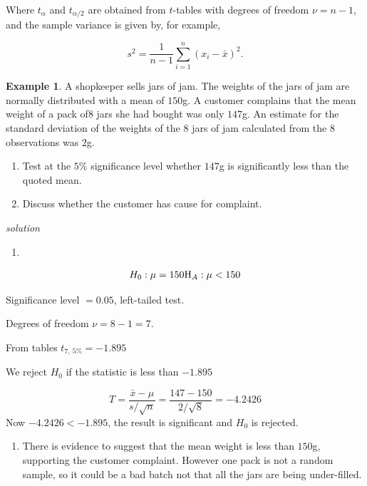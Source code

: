 \documentclass[
]{book}
\providecommand{\tightlist}{%
  \setlength{\itemsep}{0pt}\setlength{\parskip}{0pt}}
\theoremstyle{definition}
\theoremstyle{definition}
\newtheorem{example}{Example}[chapter]
\theoremstyle{definition}
\theoremstyle{definition}
\theoremstyle{remark}
\begin{document}
Where \(t_{\alpha}\) and \(t_{\alpha/2}\) are obtained from \(t\)-tables with degrees of freedom \(\nu = n-1\), and the sample variance is given by, for example,

\[s^2 =\frac{1}{n-1}\sum_{i=1}^{n}(x_i-\bar{x})^2.\]

\begin{example}

A shopkeeper sells jars of jam. The weights of the jars of jam are normally distributed with a mean of \(150\)g. A customer complains that the mean weight of a pack of\(8\) jars she had bought was only \(147\)g. An estimate for the standard deviation of the weights of the \(8\) jars of jam calculated from the \(8\) observations was \(2\)g.

\begin{enumerate}
\def\labelenumi{\alph{enumi})}
\item
  Test at the \(5\%\) significance level whether \(147\)g is significantly less than the quoted mean.
\item
  Discuss whether the customer has cause for complaint.
\end{enumerate}

\emph{solution}

\begin{enumerate}
\def\labelenumi{\alph{enumi})}
\item
\end{enumerate}

\[H_{0}: \mu = 150 \\ \text{H}_A: \mu<150\]

Significance level \(=0.05\), left-tailed test.

Degrees of freedom \(\nu = 8-1 = 7\).

From tables \(t_{7, \ 5\%} = -1.895\)

We reject \(H_0\) if the statistic is less than \(-1.895\)

\[T =\frac{\bar{x}-\mu}{s/\sqrt{n}}=\frac{147-150}{2/\sqrt{8}}=-4.2426 \]
Now \(-4.2426 < -1.895\), the result is significant and \(H_0\) is rejected.

\begin{enumerate}
\def\labelenumi{\alph{enumi})}
\setcounter{enumi}{1}
\tightlist
\item
  There is evidence to suggest that the mean weight is less than \(150\)g, supporting the customer complaint. However one pack is not a random sample, so it could be a bad batch not that all the jars are being under-filled.
\end{enumerate}

\end{example}
\end{document}

